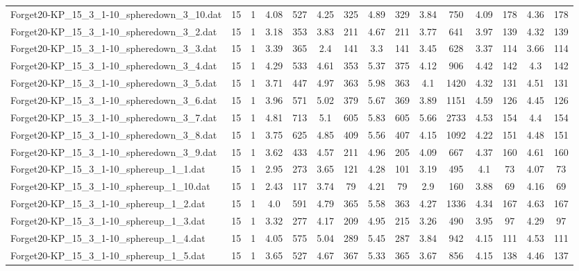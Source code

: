 \begin{table}[!ht]
{\begin{tabular}{lcccccccccccccc}
Forget20-KP\_15\_3\_1-10\_spheredown\_3\_10.dat & 15 & 1 & 4.08 & 527 & 4.25 & 325 & 4.89 & 329 & 3.84 & 750 & 4.09 & 178 & 4.36 & 178 \\
Forget20-KP\_15\_3\_1-10\_spheredown\_3\_2.dat & 15 & 1 & 3.18 & 353 & 3.83 & 211 & 4.67 & 211 & 3.77 & 641 & 3.97 & 139 & 4.32 & 139 \\
Forget20-KP\_15\_3\_1-10\_spheredown\_3\_3.dat & 15 & 1 & 3.39 & 365 & 2.4 & 141 & 3.3 & 141 & 3.45 & 628 & 3.37 & 114 & 3.66 & 114 \\
Forget20-KP\_15\_3\_1-10\_spheredown\_3\_4.dat & 15 & 1 & 4.29 & 533 & 4.61 & 353 & 5.37 & 375 & 4.12 & 906 & 4.42 & 142 & 4.3 & 142 \\
Forget20-KP\_15\_3\_1-10\_spheredown\_3\_5.dat & 15 & 1 & 3.71 & 447 & 4.97 & 363 & 5.98 & 363 & 4.1 & 1420 & 4.32 & 131 & 4.51 & 131 \\
Forget20-KP\_15\_3\_1-10\_spheredown\_3\_6.dat & 15 & 1 & 3.96 & 571 & 5.02 & 379 & 5.67 & 369 & 3.89 & 1151 & 4.59 & 126 & 4.45 & 126 \\
Forget20-KP\_15\_3\_1-10\_spheredown\_3\_7.dat & 15 & 1 & 4.81 & 713 & 5.1 & 605 & 5.83 & 605 & 5.66 & 2733 & 4.53 & 154 & 4.4 & 154 \\
Forget20-KP\_15\_3\_1-10\_spheredown\_3\_8.dat & 15 & 1 & 3.75 & 625 & 4.85 & 409 & 5.56 & 407 & 4.15 & 1092 & 4.22 & 151 & 4.48 & 151 \\
Forget20-KP\_15\_3\_1-10\_spheredown\_3\_9.dat & 15 & 1 & 3.62 & 433 & 4.57 & 211 & 4.96 & 205 & 4.09 & 667 & 4.37 & 160 & 4.61 & 160 \\
Forget20-KP\_15\_3\_1-10\_sphereup\_1\_1.dat & 15 & 1 & 2.95 & 273 & 3.65 & 121 & 4.28 & 101 & 3.19 & 495 & 4.1 & 73 & 4.07 & 73 \\
Forget20-KP\_15\_3\_1-10\_sphereup\_1\_10.dat & 15 & 1 & 2.43 & 117 & 3.74 & 79 & 4.21 & 79 & 2.9 & 160 & 3.88 & 69 & 4.16 & 69 \\
Forget20-KP\_15\_3\_1-10\_sphereup\_1\_2.dat & 15 & 1 & 4.0 & 591 & 4.79 & 365 & 5.58 & 363 & 4.27 & 1336 & 4.34 & 167 & 4.63 & 167 \\
Forget20-KP\_15\_3\_1-10\_sphereup\_1\_3.dat & 15 & 1 & 3.32 & 277 & 4.17 & 209 & 4.95 & 215 & 3.26 & 490 & 3.95 & 97 & 4.29 & 97 \\
Forget20-KP\_15\_3\_1-10\_sphereup\_1\_4.dat & 15 & 1 & 4.05 & 575 & 5.04 & 289 & 5.45 & 287 & 3.84 & 942 & 4.15 & 111 & 4.53 & 111 \\
Forget20-KP\_15\_3\_1-10\_sphereup\_1\_5.dat & 15 & 1 & 3.65 & 527 & 4.67 & 367 & 5.33 & 365 & 3.67 & 856 & 4.15 & 138 & 4.46 & 137 \\

\end{tabular}}
\end{table}
